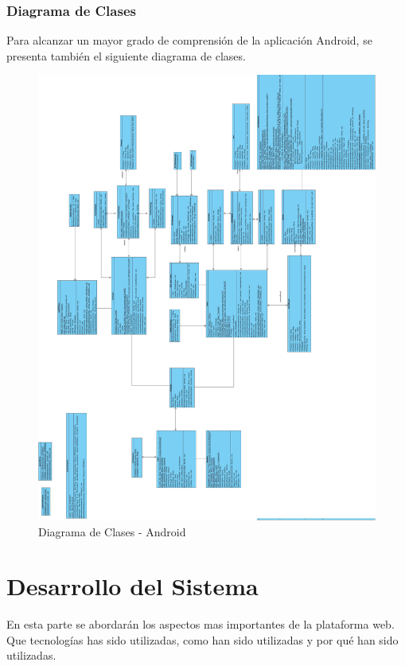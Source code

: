 \documentclass[a4paper,11pt]{book}
\begin{document}
\subsection{Diagrama de Clases}
Para alcanzar un mayor grado de comprensión de la aplicación Android, se presenta también el siguiente diagrama de clases. 
\begin{figure}[H] 
\centering 
\includegraphics[scale=0.15]{imagenes/clases/clasesAndroid.jpg}
\caption{ Diagrama de Clases - Android\cite{propio}  }  
\end{figure}




\chapter{Desarrollo del Sistema}
En esta parte se abordarán los aspectos mas importantes de la plataforma web. Que tecnologías has sido utilizadas, como han sido utilizadas y por qué han sido utilizadas.
\end{document}
